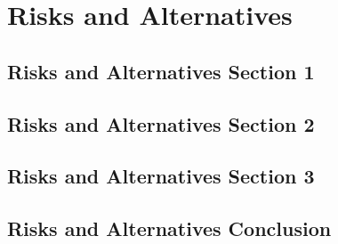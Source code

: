 %
\chapter{Risks and Alternatives}
\label{sec:risksandalternatives}

\section{Risks and Alternatives Section 1}
\label{sec:risksandalternatives:sec1}

\Blindtext[2][2]

\section{Risks and Alternatives Section 2}
\label{sec:risksandalternatives:sec2}

\Blindtext[3][2]

\section{Risks and Alternatives Section 3}
\label{sec:risksandalternatives:sec3}

\Blindtext[4][2]

\section{Risks and Alternatives Conclusion}
\label{sec:risksandalternatives:conclusion}

\Blindtext[2][1]
